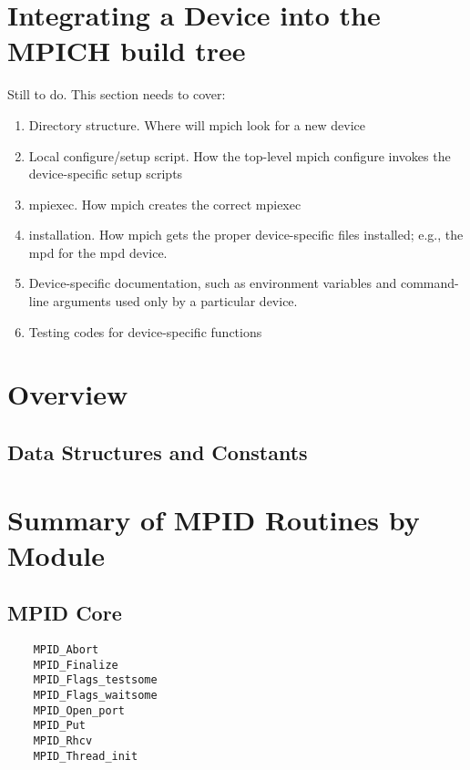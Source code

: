 \documentclass{article}
\begin{document}
%


\section{Integrating a Device into the MPICH build tree}
Still to do.  This section needs to cover:
\begin{enumerate}
\item Directory structure.  Where will mpich look for a new device
\item Local configure/setup script.  How the top-level mpich configure invokes
  the device-specific setup scripts
\item mpiexec.  How mpich creates the correct mpiexec
\item installation.  How mpich gets the proper device-specific files
  installed; e.g., the mpd for the mpd device.
\item Device-specific documentation, such as environment variables and
  command-line arguments used only by a particular device.
\item Testing codes for device-specific functions
\end{enumerate}

\mancontentstrue

\section{Overview}



\subsection{Data Structures and Constants}




\section{Summary of MPID Routines by Module}

\subsection{MPID Core}
\begin{verbatim}
    MPID_Abort
    MPID_Finalize
    MPID_Flags_testsome
    MPID_Flags_waitsome
    MPID_Open_port
    MPID_Put
    MPID_Rhcv
    MPID_Thread_init
\end{verbatim}
\end{document}
